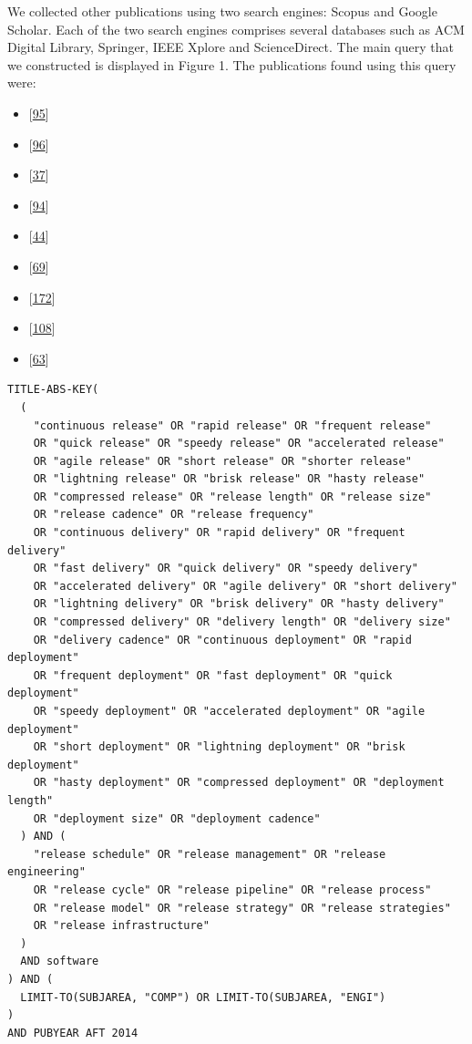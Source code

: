 \documentclass[]{book}
\providecommand{\tightlist}{%
  \setlength{\itemsep}{0pt}\setlength{\parskip}{0pt}}
\begin{document}
We collected other publications using two search engines: Scopus and
Google Scholar. Each of the two search engines comprises several
databases such as ACM Digital Library, Springer, IEEE Xplore and
ScienceDirect. The main query that we constructed is displayed in Figure
1. The publications found using this query were:

\begin{itemize}
\tightlist
\item
  {[}\protect\hyperlink{ref-kaur2019a}{95}{]}
\item
  {[}\protect\hyperlink{ref-kerzazi2013a}{96}{]}
\item
  {[}\protect\hyperlink{ref-castelluccio2017a}{37}{]}
\item
  {[}\protect\hyperlink{ref-karvonen2017a}{94}{]}
\item
  {[}\protect\hyperlink{ref-claes2017a}{44}{]}
\item
  {[}\protect\hyperlink{ref-fujibayashi2017a}{69}{]}
\item
  {[}\protect\hyperlink{ref-souza2015a}{172}{]}
\item
  {[}\protect\hyperlink{ref-laukkanen2018a}{108}{]}
\item
  {[}\protect\hyperlink{ref-dyck2015a}{63}{]}
\end{itemize}

\begin{verbatim}
TITLE-ABS-KEY(
  (
    "continuous release" OR "rapid release" OR "frequent release"
    OR "quick release" OR "speedy release" OR "accelerated release"
    OR "agile release" OR "short release" OR "shorter release"
    OR "lightning release" OR "brisk release" OR "hasty release"
    OR "compressed release" OR "release length" OR "release size"
    OR "release cadence" OR "release frequency"
    OR "continuous delivery" OR "rapid delivery" OR "frequent delivery"
    OR "fast delivery" OR "quick delivery" OR "speedy delivery"
    OR "accelerated delivery" OR "agile delivery" OR "short delivery"
    OR "lightning delivery" OR "brisk delivery" OR "hasty delivery"
    OR "compressed delivery" OR "delivery length" OR "delivery size"
    OR "delivery cadence" OR "continuous deployment" OR "rapid deployment"
    OR "frequent deployment" OR "fast deployment" OR "quick deployment"
    OR "speedy deployment" OR "accelerated deployment" OR "agile deployment"
    OR "short deployment" OR "lightning deployment" OR "brisk deployment"
    OR "hasty deployment" OR "compressed deployment" OR "deployment length"
    OR "deployment size" OR "deployment cadence"
  ) AND (
    "release schedule" OR "release management" OR "release engineering"
    OR "release cycle" OR "release pipeline" OR "release process"
    OR "release model" OR "release strategy" OR "release strategies"
    OR "release infrastructure"
  )
  AND software
) AND (
  LIMIT-TO(SUBJAREA, "COMP") OR LIMIT-TO(SUBJAREA, "ENGI")
)
AND PUBYEAR AFT 2014
\end{verbatim}
\end{document}
